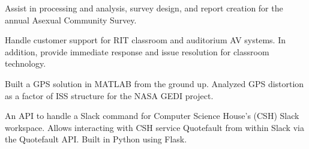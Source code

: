 \documentclass[10pt,a4paper]{altacv}
\begin{document}

\begin{fullwidth}
\marginpar{\makesidebarheader}
    \vspace*{-1\baselineskip}
\makecvheader
\end{fullwidth}

Assist in processing and analysis, survey design, and report creation for the annual Asexual Community Survey.

\divider

Handle customer support for RIT classroom and auditorium AV systems.
In addition, provide immediate response and issue resolution for classroom technology.

\divider

Built a GPS solution in MATLAB from the ground up. Analyzed GPS distortion as a factor of ISS structure for the NASA GEDI project.


An API to handle a Slack command for Computer Science House's (CSH) Slack workspace.
Allows interacting with CSH service Quotefault from within Slack via the Quotefault API.
Built in Python using Flask.

\divider
\end{document}
